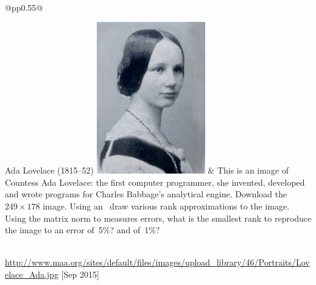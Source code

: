 \begin{exercise}\ \\ \label{ex:lovelace} 
\begin{tabular}{@{}p{\marginparwidth}p{0.55\linewidth}@{}}
\raggedright
Ada Lovelace (1815--52)
\includegraphics[width=\linewidth]{ApproxMat/Lovelace_Ada} 
&
This is an image of Countess Ada Lovelace: the first computer programmer, she invented, developed and wrote programs for Charles Babbage's analytical engine.
Download the \(249\times178\) image.
Using an \svd\ draw various rank approximations to the image.
Using the matrix norm to measures errors, what is the smallest rank to reproduce the image to an error of~5\%? and of~1\%?
\end{tabular}\\
\url{http://www.maa.org/sites/default/files/images/upload_library/46/Portraits/Lovelace_Ada.jpg} 
[Sep 2015]
\end{exercise}







